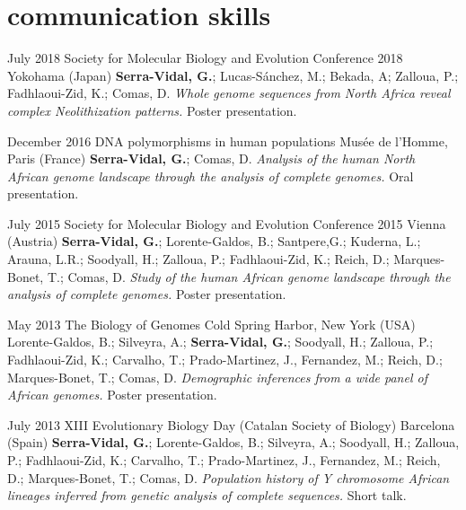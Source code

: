 \documentclass[]{friggeri-cv}
\begin{document}
\section{communication skills}

\begin{entrylist}
	\entry
	{July 2018}
	{Society for Molecular Biology and Evolution Conference 2018}
	{Yokohama (Japan)}
	{\textbf{\boldfont Serra-Vidal, G.}; Lucas-Sánchez, M.; Bekada, A; Zalloua, P.; Fadhlaoui-Zid, K.; Comas, D. \emph{Whole genome sequences from North Africa reveal complex Neolithization patterns.} Poster presentation.}
	
	\entry
	{December 2016}
	{DNA polymorphisms in human populations}
	{Musée de l'Homme, Paris (France)}
	{\textbf{\boldfont Serra-Vidal, G.}; Comas, D. \emph{Analysis of the human North African genome landscape through the analysis of complete genomes.} Oral presentation.}
	
	\entry
	{July 2015}
	{Society for Molecular Biology and Evolution Conference 2015}
	{Vienna (Austria)}
	{\textbf{\boldfont Serra-Vidal, G.}; Lorente-Galdos, B.; Santpere,G.; Kuderna, L.; Arauna, L.R.; Soodyall, H.; Zalloua, P.; Fadhlaoui-Zid, K.; Reich, D.; Marques-Bonet, T.; Comas, D. \emph{Study of the human African genome landscape through the analysis of complete genomes.} Poster presentation.}
	
	
	\entry
	{May 2013}
	{The Biology of Genomes}
	{Cold Spring Harbor, New York (USA)}
	{Lorente-Galdos, B.; Silveyra, A.; \textbf{\boldfont Serra-Vidal, G.}; Soodyall, H.; Zalloua, P.; Fadhlaoui-Zid, K.; Carvalho, T.; Prado-Martinez, J., Fernandez, M.; Reich, D.; Marques-Bonet, T.; Comas, D. \emph{Demographic inferences from a wide panel of African genomes.} Poster presentation.}
	
	\entry
	{July 2013}
	{XIII Evolutionary Biology Day (Catalan Society of Biology)}
	{Barcelona (Spain)}
	{\textbf{\boldfont Serra-Vidal, G.}; Lorente-Galdos, B.; Silveyra, A.; Soodyall, H.; Zalloua, P.; Fadhlaoui-Zid, K.; Carvalho, T.; Prado-Martinez, J., Fernandez, M.; Reich, D.; Marques-Bonet, T.; Comas, D. \emph{Population history of Y chromosome African lineages inferred from genetic analysis of complete sequences.} Short talk.}
	
	
\end{entrylist}
\end{document}
